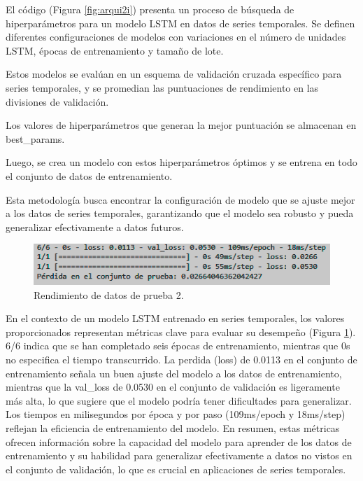 El código (Figura \ref{fig:arqui2i}) presenta un proceso de búsqueda de
hiperparámetros para un modelo LSTM en datos de series temporales. Se definen
diferentes configuraciones de modelos con variaciones en el número de unidades
LSTM, épocas de entrenamiento y tamaño de lote.

\vspace{1\baselineskip}
Estos modelos se evalúan en un esquema de validación cruzada específico para series temporales, y se promedian las puntuaciones de rendimiento en las
divisiones de validación.

\vspace{1\baselineskip}
Los valores de hiperparámetros que generan la mejor puntuación se almacenan en best\_params.

\vspace{1\baselineskip}
Luego, se crea un modelo con estos hiperparámetros óptimos y se entrena en todo el conjunto de datos de entrenamiento.

\vspace{1\baselineskip}
Esta metodología busca encontrar la configuración de modelo que se ajuste mejor a los datos de series temporales, garantizando que el modelo sea robusto y pueda generalizar efectivamente a datos futuros.

\begin{figure}[H]
  \begin{center}
    \includegraphics[scale=0.80]{./res2i.png}
    \caption{Rendimiento de datos de prueba 2.}
    \label{fig:res2}
  \end{center}
\end{figure}

En el contexto de un modelo LSTM entrenado en series temporales, los valores proporcionados representan métricas clave para evaluar su desempeño (Figura \ref{fig:res2}). 6/6 indica que se han completado seis épocas de entrenamiento,
mientras que 0s no especifica el tiempo transcurrido. La perdida (loss) de 0.0113 en el conjunto de entrenamiento señala un buen ajuste del modelo a los datos de entrenamiento, mientras que la val\_loss de 0.0530 en el conjunto de validación es ligeramente más alta, lo que sugiere que el modelo podría tener dificultades
para generalizar. Los tiempos en milisegundos por época y por paso (109ms/epoch y 18ms/step) reflejan la eficiencia de entrenamiento del modelo. En resumen, estas métricas ofrecen información sobre la capacidad del modelo para aprender
de los datos de entrenamiento y su habilidad para generalizar efectivamente a datos no vistos en el conjunto de validación, lo que es crucial en aplicaciones de series temporales.

